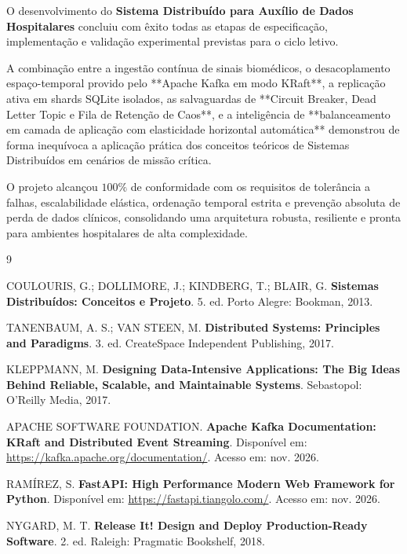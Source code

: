 \documentclass[12pt,a4paper]{article}
\begin{document}
O desenvolvimento do \textbf{Sistema Distribuído para Auxílio de Dados Hospitalares} concluiu com êxito todas as etapas de especificação, implementação e validação experimental previstas para o ciclo letivo.

A combinação entre a ingestão contínua de sinais biomédicos, o desacoplamento espaço-temporal provido pelo **Apache Kafka em modo KRaft**, a replicação ativa em shards SQLite isolados, as salvaguardas de **Circuit Breaker, Dead Letter Topic e Fila de Retenção de Caos**, e a inteligência de **balanceamento em camada de aplicação com elasticidade horizontal automática** demonstrou de forma inequívoca a aplicação prática dos conceitos teóricos de Sistemas Distribuídos em cenários de missão crítica.

O projeto alcançou $100\%$ de conformidade com os requisitos de tolerância a falhas, escalabilidade elástica, ordenação temporal estrita e prevenção absoluta de perda de dados clínicos, consolidando uma arquitetura robusta, resiliente e pronta para ambientes hospitalares de alta complexidade.

\newpage
\begin{thebibliography}{9}

COULOURIS, G.; DOLLIMORE, J.; KINDBERG, T.; BLAIR, G.
\textbf{Sistemas Distribuídos: Conceitos e Projeto}.
5. ed. Porto Alegre: Bookman, 2013.

TANENBAUM, A. S.; VAN STEEN, M.
\textbf{Distributed Systems: Principles and Paradigms}.
3. ed. CreateSpace Independent Publishing, 2017.

KLEPPMANN, M.
\textbf{Designing Data-Intensive Applications: The Big Ideas Behind Reliable, Scalable, and Maintainable Systems}.
Sebastopol: O'Reilly Media, 2017.

APACHE SOFTWARE FOUNDATION.
\textbf{Apache Kafka Documentation: KRaft and Distributed Event Streaming}.
Disponível em: \url{https://kafka.apache.org/documentation/}. Acesso em: nov. 2026.

RAMÍREZ, S.
\textbf{FastAPI: High Performance Modern Web Framework for Python}.
Disponível em: \url{https://fastapi.tiangolo.com/}. Acesso em: nov. 2026.

NYGARD, M. T.
\textbf{Release It! Design and Deploy Production-Ready Software}.
2. ed. Raleigh: Pragmatic Bookshelf, 2018.

\end{thebibliography}
\end{document}
